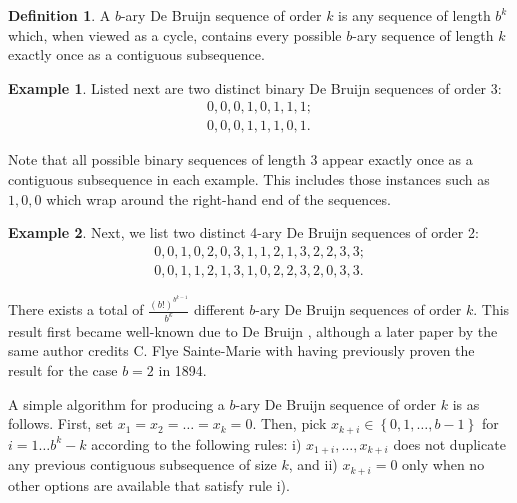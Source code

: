 \documentclass[11pt,a4paper]{tesis}
\theoremstyle{plain}
\theoremstyle{definition}
\newtheorem*{definition*}{Definition}
\newtheorem*{exmp*}{Example}
\begin{document}
\begin{definition*}
  A $b$-ary De Bruijn sequence of order $k$ is any sequence of length $b^k$ which, when viewed as a cycle, contains every possible $b$-ary sequence of length $k$ exactly once as a contiguous subsequence.
\end{definition*}

\begin{exmp*}
  Listed next are two distinct binary De Bruijn sequences of order 3:
  \begin{equation*}
    \begin{aligned}
      0, 0, 0, 1, 0, 1, 1, 1; \\
      0, 0, 0, 1, 1, 1, 0, 1.
    \end{aligned}
  \end{equation*}
\end{exmp*}

Note that all possible binary sequences of length 3 appear exactly once as a contiguous subsequence in each example. This includes those instances such as $1, 0, 0$ which wrap around the right-hand end of the sequences.

\begin{exmp*}
  Next, we list two distinct 4-ary De Bruijn sequences of order 2:
  \begin{equation*}
    \begin{aligned}
      0, 0, 1, 0, 2, 0, 3, 1, 1, 2, 1, 3, 2, 2, 3, 3; \\
      0, 0, 1, 1, 2, 1, 3, 1, 0, 2, 2, 3, 2, 0, 3, 3.
    \end{aligned}
  \end{equation*}  
\end{exmp*}

There exists a total of $\frac{(b!)^{b^{k - 1}}}{b^k}$ different $b$-ary De Bruijn sequences of order $k$. This result first became well-known due to De Bruijn \cite{de-bruijn-1946}, although a later paper by the same author credits C. Flye Sainte-Marie with having previously proven the result for the case $b = 2$ in 1894.

A simple algorithm for producing a $b$-ary De Bruijn sequence of order $k$ is as follows. First, set $x_1 = x_2 = \dots = x_k = 0$. Then, pick $x_{k + i} \in \left\{ 0, 1, \dots, b - 1 \right\}$ for $i = 1 \dots b^k - k$ according to the following rules: i) $x_{1 + i}, \dots, x_{k + i}$ does not duplicate any previous contiguous subsequence of size $k$, and ii) $x_{k + i} = 0$ only when no other options are available that satisfy rule i).
\end{document}
